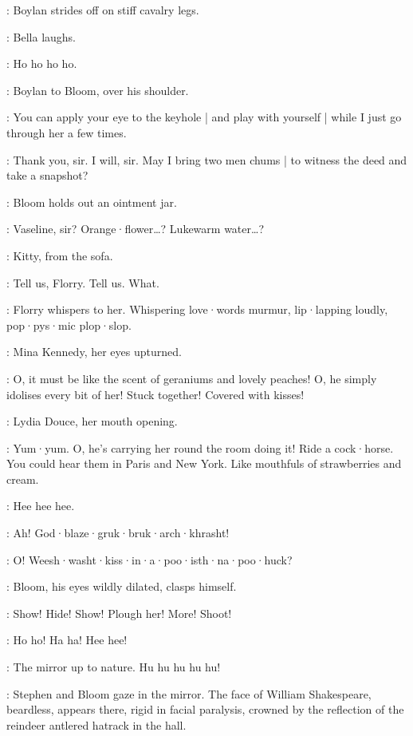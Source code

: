 :
Boylan strides off on stiff cavalry legs.

:
Bella laughs.

\Bella:
Ho ho ho ho.

:
Boylan to Bloom,
over his shoulder.

\Boylan:
You can apply your eye to the keyhole |
and play with yourself |
while I just go through her a few times.

\Bloom:
Thank you,
sir.
I will,
sir.
May I bring two men chums |
to witness the deed and take a snapshot?

:
Bloom holds out an ointment jar.

\Bloom:
Vaseline,
sir?
Orange·flower…?
Lukewarm water…?

:
Kitty,
from the sofa.

\Kitty:
Tell us,
Florry.
Tell us.
What.

:
Florry whispers to her.
Whispering love·words murmur,
lip·lapping loudly,
pop·pys·mic plop·slop.

:
Mina Kennedy,
her eyes upturned.

\MinaKennedy:
O,
it must be like the scent of geraniums and lovely peaches!
%
O,
he simply idolises every bit of her!
Stuck together!
Covered with kisses!

:
Lydia Douce,
her mouth opening.

\LydiaDouce:
Yum·yum.
O,
he's carrying her round the room doing it!
Ride a cock·horse.
You could hear them in Paris and New York.
Like mouthfuls of strawberries and cream.

\Kitty:
Hee hee hee.

\BoylansVoice:
Ah!
God·blaze·gruk·bruk·arch·khrasht!%

\MarionsVoice:
O!
Weesh·washt·kiss·in·a·poo·isth·na·poo·huck?

:
Bloom,
his eyes wildly dilated,
clasps himself.

\Bloom:
Show! Hide! Show!
Plough her!
More!
Shoot!

\BellaZoeFlorryKitty:
Ho ho!
Ha ha!
Hee hee!

\Lynch:
The mirror up to nature.
%
Hu hu hu hu hu!

:
Stephen and Bloom gaze in the mirror.
The face of William Shakespeare,
beardless,
appears there,
rigid in facial paralysis,
crowned by the reflection of the reindeer antlered hatrack in the hall.

